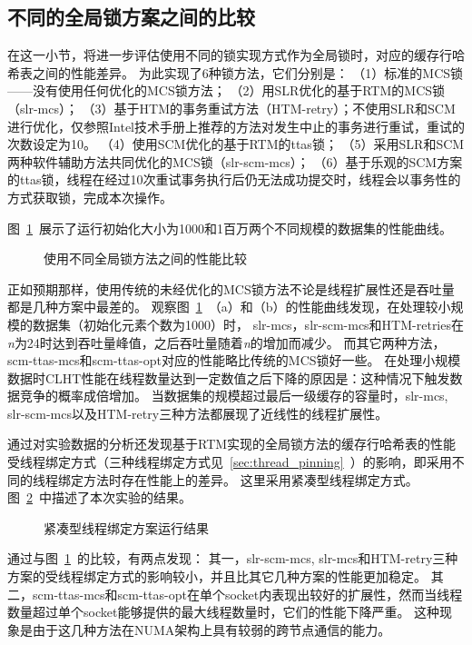 \subsection{不同的全局锁方案之间的比较}
\label{sec:htm_global}
在这一小节，将进一步评估使用不同的锁实现方式作为全局锁时，对应的缓存行哈希表之间的性能差异。
为此实现了6种锁方法，它们分别是：
（1）标准的MCS锁——没有使用任何优化的MCS锁方法；
（2）用SLR优化的基于RTM的MCS锁（slr-mcs）；
（3）基于HTM的事务重试方法（HTM-retry）；不使用SLR和SCM进行优化，仅参照Intel技术手册上推荐的方法对发生中止的事务进行重试，重试的次数设定为10。
（4）使用SCM优化的基于RTM的ttas锁；
（5）采用SLR和SCM两种软件辅助方法共同优化的MCS锁（slr-scm-mcs）；
（6）基于乐观的SCM方案的ttas锁，线程在经过10次重试事务执行后仍无法成功提交时，线程会以事务性的方式获取锁，完成本次操作。

图~\ref{fig:htm_global}~展示了运行初始化大小为1000和1百万两个不同规模的数据集的性能曲线。
\begin{figure}[htbp]
\centering
\caption{使用不同全局锁方法之间的性能比较}
\label{fig:htm_global}
\end{figure}
正如预期那样，使用传统的未经优化的MCS锁方法不论是线程扩展性还是吞吐量都是几种方案中最差的。
观察图~\ref{fig:htm_global}~（a）和（b）的性能曲线发现，在处理较小规模的数据集（初始化元素个数为1000）时，
slr-mcs，slr-scm-mcs和HTM-retries在\textit{n}为24时达到吞吐量峰值，之后吞吐量随着\textit{n}的增加而减少。
而其它两种方法，scm-ttas-mcs和scm-ttas-opt对应的性能略比传统的MCS锁好一些。
在处理小规模数据时CLHT性能在线程数量达到一定数值之后下降的原因是：这种情况下触发数据竞争的概率成倍增加。
当数据集的规模超过最后一级缓存的容量时，slr-mcs, slr-scm-mcs以及HTM-retry三种方法都展现了近线性的线程扩展性。

通过对实验数据的分析还发现基于RTM实现的全局锁方法的缓存行哈希表的性能受线程绑定方式（三种线程绑定方式见~\ref{sec:thread_pinning}~）的影响，即采用不同的线程绑定方法时存在性能上的差异。
这里采用紧凑型线程绑定方式。
图~\ref{fig:htm_pinning}~中描述了本次实验的结果。
\begin{figure}[htbp]
\centering
\caption{紧凑型线程绑定方案运行结果}
\label{fig:htm_pinning}
\end{figure}
通过与图~\ref{fig:htm_global}~的比较，有两点发现：
其一，slr-scm-mcs, slr-mcs和HTM-retry三种方案的受线程绑定方式的影响较小，并且比其它几种方案的性能更加稳定。
其二，scm-ttas-mcs和scm-ttas-opt在单个socket内表现出较好的扩展性，然而当线程数量超过单个socket能够提供的最大线程数量时，它们的性能下降严重。
这种现象是由于这几种方法在NUMA架构上具有较弱的跨节点通信的能力。

